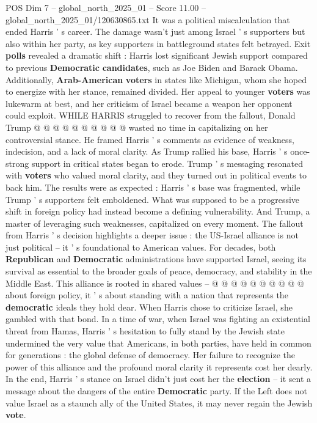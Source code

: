 \begin{textsample}{POS Dim 7 – global\_north\_2025\_01 – Score 11.00 – global\_north\_2025\_01/120630865.txt}
It was a political miscalculation that ended Harris ' s career.
The damage wasn't just among Israel ' s supporters but also within her party, as key supporters in battleground states felt betrayed.
Exit \textbf{polls} revealed a dramatic shift : Harris lost significant Jewish support compared to previous \textbf{Democratic} \textbf{candidates}, such as Joe Biden and Barack Obama.
Additionally, \textbf{Arab-American} \textbf{voters} in states like Michigan, whom she hoped to energize with her stance, remained divided.
Her appeal to younger \textbf{voters} was lukewarm at best, and her criticism of Israel became a weapon her opponent could exploit.
WHILE HARRIS struggled to recover from the fallout, Donald Trump @ @ @ @ @ @ @ @ @ @ wasted no time in capitalizing on her controversial stance.
He framed Harris ' s comments as evidence of weakness, indecision, and a lack of moral clarity.
As Trump rallied his base, Harris ' s once-strong support in critical states began to erode.
Trump ' s messaging resonated with \textbf{voters} who valued moral clarity, and they turned out in political events to back him.
The results were as expected : Harris ' s base was fragmented, while Trump ' s supporters felt emboldened.
What was supposed to be a progressive shift in foreign policy had instead become a defining vulnerability.
And Trump, a master of leveraging such weaknesses, capitalized on every moment.
The fallout from Harris ' s decision highlights a deeper issue : the US-Israel alliance is not just political -- it ' s foundational to American values.
For decades, both \textbf{Republican} and \textbf{Democratic} administrations have supported Israel, seeing its survival as essential to the broader goals of peace, democracy, and stability in the Middle East.
This alliance is rooted in shared values -- @ @ @ @ @ @ @ @ @ @ about foreign policy, it ' s about standing with a nation that represents the \textbf{democratic} ideals they hold dear.
When Harris chose to criticize Israel, she gambled with that bond.
In a time of war, when Israel was fighting an existential threat from Hamas, Harris ' s hesitation to fully stand by the Jewish state undermined the very value that Americans, in both parties, have held in common for generations : the global defense of democracy.
Her failure to recognize the power of this alliance and the profound moral clarity it represents cost her dearly.
In the end, Harris ' s stance on Israel didn't just cost her the \textbf{election} -- it sent a message about the dangers of the entire \textbf{Democratic} party.
If the Left does not value Israel as a staunch ally of the United States, it may never regain the Jewish \textbf{vote}.

\end{textsample}
